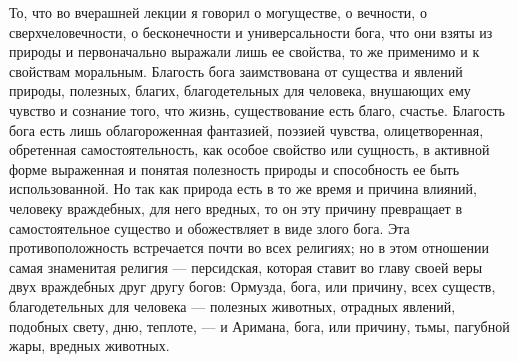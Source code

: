 \documentclass[12pt]{article}
\begin{document}
То, что во вчерашней лекции я говорил о могуществе, о вечности, о сверхчеловечности, о бесконечности и универсальности бога, что они взяты из природы и первоначально выражали лишь ее свойства, то же применимо и к свойствам моральным. Благость бога заимствована от существа и явлений природы, полезных, благих, благодетельных для человека, внушающих ему чувство и сознание того, что жизнь, существование есть благо, счастье. Благость бога есть лишь облагороженная фантазией, поэзией чувства, олицетворенная, обретенная самостоятельность, как особое свойство или сущность, в активной форме выраженная и понятая полезность природы и способность ее быть использованной. Но так как природа есть в то же время и причина влияний, человеку враждебных, для него вредных, то он эту причину превращает в самостоятельное существо и обожествляет в виде злого бога. Эта противоположность встречается почти во всех религиях; но в этом отношении самая знаменитая религия --- персидская, которая ставит во главу своей веры двух враждебных друг другу богов: Ормузда, бога, или причину, всех существ, благодетельных для человека --- полезных животных, отрадных явлений, подобных свету, дню, теплоте, --- и Аримана, бога, или причину, тьмы, пагубной жары, вредных животных. 
\end{document}
